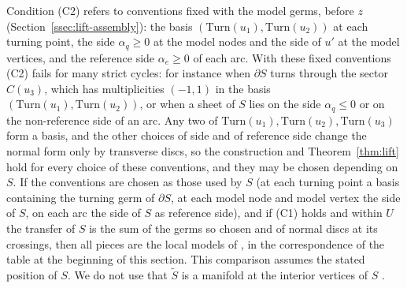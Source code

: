 \begin{remark}
Condition (C2) refers to conventions fixed with the model germs, before $z$ (Section~\ref{ssec:lift-assembly}): the basis
$(\mathrm{Turn}(u_1),\mathrm{Turn}(u_2))$ at each turning point, the side $\alpha_q\ge0$ at the model nodes and the side of
$u'$ at the model vertices, and the reference side $\alpha_e\ge0$ of each arc. With these fixed conventions (C2) fails for
many strict cycles: for instance when $\partial S$ turns through the sector $C(u_3)$, which has multiplicities $(-1,1)$ in
the basis $(\mathrm{Turn}(u_1),\mathrm{Turn}(u_2))$, or when a sheet of $S$ lies on the side $\alpha_q\le0$ or on the
non-reference side of an arc. Any two of $\mathrm{Turn}(u_1),\mathrm{Turn}(u_2),\mathrm{Turn}(u_3)$ form a basis, and the
other choices of side and of reference side change the normal form only by transverse discs, so the construction and
Theorem~\ref{thm:lift} hold for every choice of these conventions, and they may be chosen depending on $S$. If the
conventions are chosen as those used by $S$ (at each turning point a basis containing the turning
germ of $\partial S$, at each model node and model vertex the side of $S$, on each arc the side of $S$ as reference
side), and if (C1) holds and within $U$ the transfer of $S$ is the sum of the germs so chosen and of normal discs at its
crossings, then all pieces are the local models of \cite{CBM}, in the correspondence of the table at the
beginning of this section. This comparison assumes the stated position of $S$.
We do not use that $\widetilde S$ is a manifold at the interior vertices of $S$ \cite[\S7.7, Step~5]{CBM}.
\end{remark}
